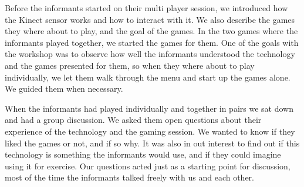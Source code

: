 Before the informants started on their multi player session, we introduced how the Kinect sensor works and how to interact with it. We also describe the games they where about to play, and the goal of the games. In the two games where the informants played together, we started the games for them. One of the goals with the workshop was to observe how well the informants understood the technology and the games presented for them, so when they where about to play individually, we let them walk through the menu and start up the games alone. We guided them when necessary. 

When the informants had played individually and together in pairs we sat down and had a group discussion. We asked them open questions about their experience of the technology and the gaming session. We wanted to know if they liked the games or not, and if so why. It was also in out interest to find out if this technology is something the informants would use, and if they could imagine using it for exercise. Our questions acted just as a starting point for discussion, most of the time the informants talked freely with us and each other.                   